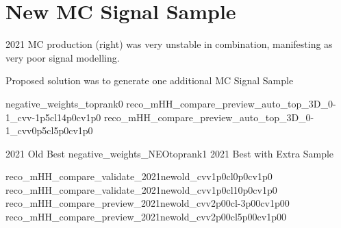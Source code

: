\section{New MC Signal Sample}
{ \small
    2021 MC production (right) was very unstable in combination,
    manifesting as very poor signal modelling.
    \vspace{5 mm}

    Proposed solution was to generate one additional MC Signal Sample
}{negative_weights_toprank0}
{reco_mHH_compare_preview_auto_top_3D_0-1_cvv-1p5cl14p0cv1p0}
{reco_mHH_compare_preview_auto_top_3D_0-1_cvv0p5cl5p0cv1p0}

{2021 Old Best}
{negative_weights_NEOtoprank1}
{2021 Best with Extra Sample}

{reco_mHH_compare_validate_2021newold_cvv1p0cl0p0cv1p0}
{reco_mHH_compare_validate_2021newold_cvv1p0cl10p0cv1p0}
{reco_mHH_compare_preview_2021newold_cvv2p00cl-3p00cv1p00}
{reco_mHH_compare_preview_2021newold_cvv2p00cl5p00cv1p00}


